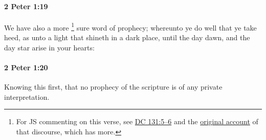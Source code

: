 		\paragraph{2 Peter 1:19} %
			\label{2PETER-1-19}

			We have also a more%
				\footnote{%
					For JS commenting on this verse, see \hyperref[DC131-5]{DC 131:5--6} and the \hyperref[EMS-1843-JS-17-MAY-1843-A-WC]{original account} of that discourse, which has more.
					}
			sure word of prophecy; whereunto ye do well that ye take heed, as unto a light that shineth in a dark place, until the day dawn, and the day star arise in your hearts:

			\begin{framed}
			\scriptsize
				\begin{compactdesc}
					\item[SBLG] 
				\end{compactdesc}
			\end{framed}

		\paragraph{2 Peter 1:20} %
			\label{2PETER-1-20}

			Knowing this first, that no prophecy of the scripture is of any private interpretation.

